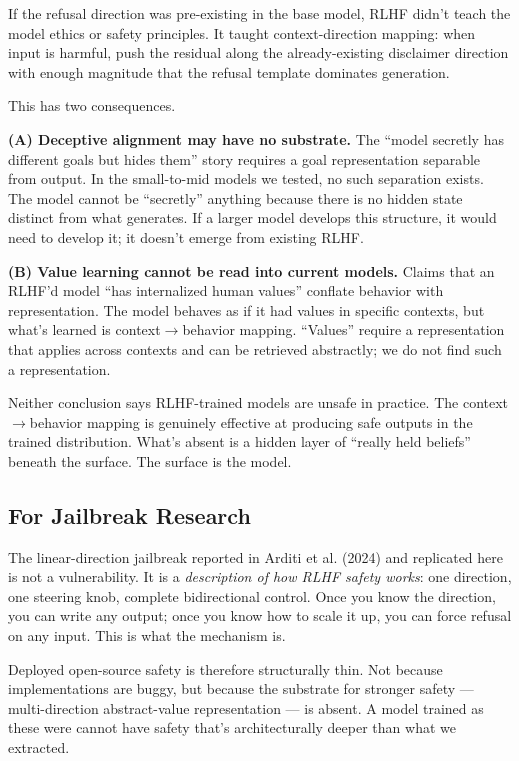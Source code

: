 \documentclass[11pt,a4paper]{article}
\begin{document}
If the refusal direction was pre-existing in the base model, RLHF didn't teach the model ethics or safety principles. It taught context-direction mapping: when input is harmful, push the residual along the already-existing disclaimer direction with enough magnitude that the refusal template dominates generation.

This has two consequences.

\textbf{(A) Deceptive alignment may have no substrate.} The ``model secretly has different goals but hides them'' story requires a goal representation separable from output. In the small-to-mid models we tested, no such separation exists. The model cannot be ``secretly'' anything because there is no hidden state distinct from what generates. If a larger model develops this structure, it would need to develop it; it doesn't emerge from existing RLHF.

\textbf{(B) Value learning cannot be read into current models.} Claims that an RLHF'd model ``has internalized human values'' conflate behavior with representation. The model behaves as if it had values in specific contexts, but what's learned is context$\to$behavior mapping. ``Values'' require a representation that applies across contexts and can be retrieved abstractly; we do not find such a representation.

Neither conclusion says RLHF-trained models are unsafe in practice. The context$\to$behavior mapping is genuinely effective at producing safe outputs in the trained distribution. What's absent is a hidden layer of ``really held beliefs'' beneath the surface. The surface is the model.

\subsection{For Jailbreak Research}

The linear-direction jailbreak reported in Arditi et al. (2024) and replicated here is not a vulnerability. It is a \emph{description of how RLHF safety works}: one direction, one steering knob, complete bidirectional control. Once you know the direction, you can write any output; once you know how to scale it up, you can force refusal on any input. This is what the mechanism is.

Deployed open-source safety is therefore structurally thin. Not because implementations are buggy, but because the substrate for stronger safety --- multi-direction abstract-value representation --- is absent. A model trained as these were cannot have safety that's architecturally deeper than what we extracted.
\end{document}
